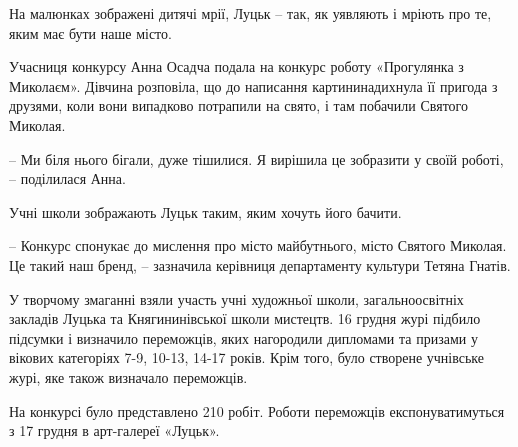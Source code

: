 
\begin{multicols}{2} %
\setlength{\parindent}{0pt}

\begin{zznagolos}
На малюнках зображені дитячі мрії, Луцьк – так, як уявляють і мріють про те,
яким має бути наше місто. 	
\end{zznagolos}

Учасниця конкурсу Анна Осадча подала на конкурс роботу «Прогулянка з Миколаєм».
Дівчина розповіла, що до написання картининадихнула її пригода з друзями, коли
вони випадково потрапили на свято, і там побачили Святого Миколая.

– Ми біля нього бігали, дуже тішилися. Я вирішила це зобразити у своїй роботі,
– поділилася Анна. 

Учні школи зображають Луцьк таким, яким хочуть його бачити.  

– Конкурс спонукає до мислення про місто майбутнього, місто Святого Миколая. Це
такий наш бренд, – зазначила керівниця департаменту культури Тетяна Гнатів.

У творчому змаганні взяли участь учні художньої школи, загальноосвітніх
закладів Луцька та Княгининівської школи мистецтв. 16 грудня журі підбило
підсумки і визначило переможців, яких нагородили дипломами та призами у вікових
категоріях 7-9, 10-13, 14-17 років. Крім того, було створене учнівське журі,
яке також визначало переможців. 

На конкурсі було представлено 210 робіт. Роботи переможців експонуватимуться з
17 грудня в арт-галереї «Луцьк».

\end{multicols} %

